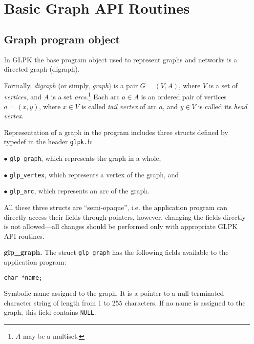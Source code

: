 \documentclass[dvipdfm,11pt]{report}
\begin{document}
\tableofcontents


\chapter{Basic Graph API Routines}

\section{Graph program object}

In GLPK the base program object used to represent graphs and networks
is a directed graph (digraph).

Formally, {\it digraph} (or simply, {\it graph}) is a pair $G=(V,A)$,
where $V$ is a set of {\it vertices}, and $A$ is a set
{\it arcs}.\footnote{$A$ may be a multiset.} Each arc $a\in A$ is an
ordered pair of vertices $a=(x,y)$, where $x\in V$ is called {\it tail
vertex} of arc $a$, and $y\in V$ is called its {\it head vertex}.

Representation of a graph in the program includes three structs defined
by typedef in the header \verb|glpk.h|:

\medskip

$\bullet$ \verb|glp_graph|, which represents the graph in a whole,

$\bullet$ \verb|glp_vertex|, which represents a vertex of the graph, and

$\bullet$ \verb|glp_arc|, which represents an arc of the graph.

\medskip

All these three structs are ``semi-opaque'', i.e. the application
program can directly access their fields through pointers, however,
changing the fields directly is not allowed---all changes should be
performed only with appropriate GLPK API routines.

\newpage

\newenvironment{comment}
{\addtolength{\leftskip}{17pt}\noindent}
{\par\addtolength{\leftskip}{-17pt}}

\noindent
{\bf glp\_graph.} The struct \verb|glp_graph| has the following
fields available to the application program:

\medskip

\noindent
\verb|char *name;|

\begin{comment}Symbolic name assigned to the graph. It is a pointer to
a null terminated character string of length from 1 to 255 characters.
If no name is assigned to the graph, this field contains \verb|NULL|.
\end{comment}
\end{document}
